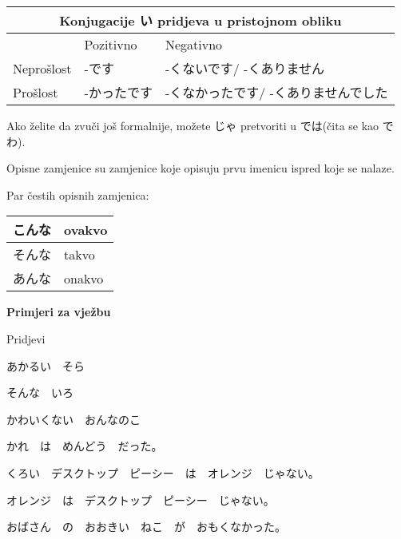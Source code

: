 		\vspace{10pt}
	\begin{tabular}{|l||l|l|}
		\hline
		\multicolumn{3}{c}{Konjugacije い pridjeva u pristojnom obliku}\\\hline
		 &Pozitivno&Negativno\\\hline
		Neprošlost&-です&-くないです/ -くありません\\\hline
		Prošlost&-かったです&-くなかったです/ -くありませんでした\\\hline
	\end{tabular}
	
\vspace{10pt}


Ako želite da zvuči još formalnije, možete じゃ pretvoriti u では(čita se kao でわ).

\iffalse
{}

Opisne zamjenice su zamjenice koje opisuju prvu imenicu ispred koje se nalaze.


Par čestih opisnih zamjenica:

 	\vspace{10pt}
	\begin{tabular}{|l|l|}
		\hline
		こんな&ovakvo\\\hline
		そんな&takvo\\\hline
		あんな&onakvo\\\hline
	\end{tabular}
\vspace{10pt}

	\begin{reibun}
	\end{reibun}

	
	\normalsize \textbf{Primjeri za vježbu}
	
	\begin{mondai}{Pridjevi}
		\item あかるい　そら
		\item そんな　いろ
		\item かわいくない　おんなのこ
		\item かれ　は　めんどう　だった。
		\item くろい　デスクトップ　ピーシー　は　オレンジ　じゃない。
		\item オレンジ　は　デスクトップ　ピーシー　じゃない。
		\item おばさん　の　おおきい　ねこ　が　おもくなかった。
	\end{mondai}

